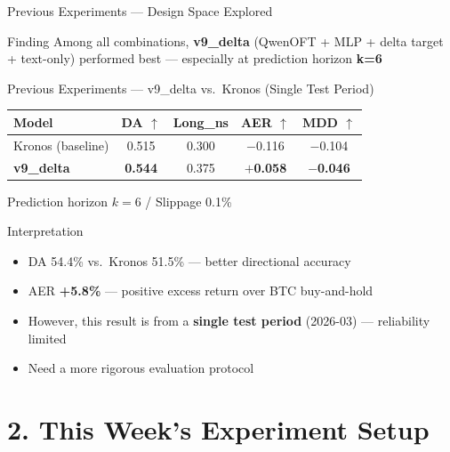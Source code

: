 \documentclass[aspectratio=169,11pt]{beamer}
\newcommand{\best}[1]{\textcolor{bestcol}{\textbf{#1}}}
\begin{document}
\begin{frame}{Previous Experiments --- Design Space Explored}
  \vspace{0.5em}
  \begin{alertblock}{Finding}
    Among all combinations, \textbf{v9\_delta} (QwenOFT + MLP + delta target + text-only)
    performed best --- especially at prediction horizon \textbf{k=6}
  \end{alertblock}
\end{frame}

\begin{frame}{Previous Experiments --- v9\_delta vs.\ Kronos (Single Test Period)}
  \begin{table}
    \centering
    \renewcommand{\arraystretch}{1.4}
    \begin{tabular}{lcccc}
      \toprule
      \textbf{Model} & \textbf{DA} $\uparrow$ & \textbf{Long\_ns} & \textbf{AER} $\uparrow$ & \textbf{MDD} $\uparrow$ \\
      \midrule
      \rowcolor{rowgray}
      Kronos (baseline) & 0.515 & 0.300 & $-$0.116 & $-$0.104 \\
      \textbf{v9\_delta}    & \best{0.544} & 0.375 & \best{$+$0.058} & \best{$-$0.046} \\
      \bottomrule
    \end{tabular}
    \par\vspace{0.3em}\centering\footnotesize Prediction horizon $k=6$ / Slippage 0.1\%
  \end{table}

  \vspace{0.3em}
  \begin{block}{Interpretation}
    \begin{itemize}
      \item DA 54.4\% vs.\ Kronos 51.5\% --- better directional accuracy
      \item AER \textbf{+5.8\%} --- positive excess return over BTC buy-and-hold
      \item However, this result is from a \textbf{single test period} (2026-03) --- reliability limited
      \item[$\Rightarrow$] Need a more rigorous evaluation protocol
    \end{itemize}
  \end{block}
\end{frame}

\section{2. This Week's Experiment Setup}
\end{document}
